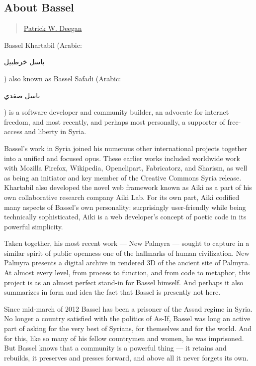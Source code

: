 \subsection{About Bassel}\label{about-bassel}

\begin{quote}
\href{../appendix/attributions.html\#patrick-w-deegan}{Patrick W.
Deegan}
\end{quote}

Bassel Khartabil (Arabic: \begin{Arabic}باسل خرطبيل‎ \end{Arabic}) also known as Bassel Safadi
(Arabic: \begin{Arabic} باسل صفدي‎ \end{Arabic}) is a software developer and community builder, an
advocate for internet freedom, and most recently, and perhaps most
personally, a supporter of free-access and liberty in Syria.

Bassel's work in Syria joined his numerous other international projects
together into a unified and focused opus. These earlier works included
worldwide work with Mozilla Firefox, Wikipedia, Openclipart,
Fabricatorz, and Sharism, as well as being an initiator and key member
of the Creative Commons Syria release. Khartabil also developed the
novel web framework known as Aiki as a part of his own collaborative
research company Aiki Lab. For its own part, Aiki codified many aspects
of Bassel's own personality: surprisingly user-friendly while being
technically sophisticated, Aiki is a web developer's concept of poetic
code in its powerful simplicity.

Taken together, his most recent work --- New Palmyra --- sought to
capture in a similar spirit of public openness one of the hallmarks of
human civilization. New Palmyra presents a digital archive in rendered
3D of the ancient site of Palmyra. At almost every level, from process
to function, and from code to metaphor, this project is as an almost
perfect stand-in for Bassel himself. And perhaps it also summarizes in
form and idea the fact that Bassel is presently not here.

Since mid-march of 2012 Bassel has been a prisoner of the Assad regime
in Syria. No longer a country satisfied with the politics of As-If,
Bassel was long an active part of asking for the very best of Syrians,
for themselves and for the world. And for this, like so many of his
fellow countrymen and women, he was imprisoned. But Bassel knows that a
community is a powerful thing --- it retains and rebuilds, it preserves
and presses forward, and above all it never forgets its own.
